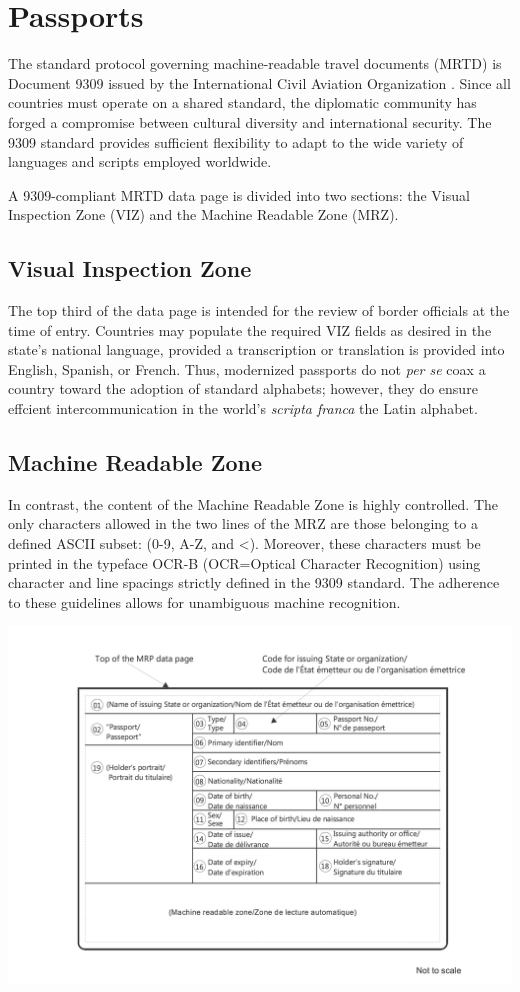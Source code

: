 \section{Passports}

The standard protocol governing machine-readable travel documents (MRTD) is
Document 9309 issued by the International Civil Aviation Organization
\parencite{ICAO9309}. Since all countries must operate on a shared standard, the
diplomatic community has forged a compromise between cultural diversity and
international security. The 9309 standard provides sufficient flexibility to
adapt to the wide variety of languages and scripts employed worldwide.

A 9309-compliant MRTD data page is divided into two sections: the Visual
Inspection Zone (VIZ) and the Machine Readable Zone (MRZ).

\subsection{Visual Inspection Zone}

The top third of the data page is intended for the review of border officials at
the time of entry. Countries may populate the required VIZ fields as desired in
the state's national language, provided a transcription or translation is
provided into English, Spanish, or French. Thus, modernized passports do not
\textit{per se} coax a country toward the adoption of standard alphabets;
however, they do ensure effcient intercommunication in the world's
\textit{scripta franca} the Latin alphabet.

\subsection{Machine Readable Zone}

In contrast, the content of the Machine Readable Zone is highly controlled. The
only characters allowed in the two lines of the MRZ are those belonging to a
defined ASCII subset: (0-9, A-Z, and <). Moreover, these characters must be
printed in the typeface OCR-B (OCR=Optical Character Recognition) using
character and line spacings strictly defined in the 9309 standard. The adherence
to these guidelines allows for unambiguous machine recognition.

\includegraphics{subtex/9309.4.3.2.4.png}


